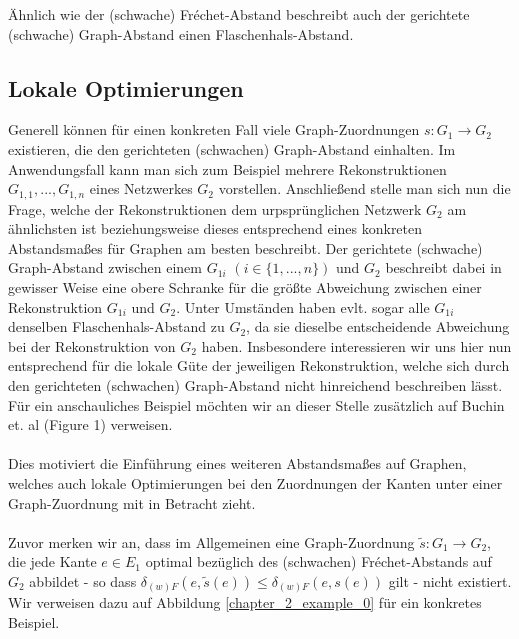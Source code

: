 \documentclass[a4paper, 12pt, twoside]{article}
\theoremstyle{Format1} %
\begin{document}
Ähnlich wie der (schwache) Fréchet-Abstand beschreibt auch der gerichtete (schwache) Graph-Abstand einen Flaschenhals-Abstand.

\subsection{Lokale Optimierungen}

Generell können für einen konkreten Fall viele Graph-Zuordnungen $s: G_1 \to G_2$ existieren, die den gerichteten (schwachen) Graph-Abstand einhalten.
Im Anwendungsfall kann man sich zum Beispiel mehrere Rekonstruktionen $G_{1,1}, ..., G_{1,n}$ eines Netzwerkes $G_2$ vorstellen.
Anschließend stelle man sich nun die Frage, welche der Rekonstruktionen dem urpsprünglichen Netzwerk $G_2$ am ähnlichsten ist beziehungsweise dieses entsprechend eines konkreten Abstandsmaßes
für Graphen am besten beschreibt.
Der gerichtete (schwache) Graph-Abstand zwischen einem $G_{1i}$ $(i \in \{1,...,n\})$ und $G_2$ beschreibt dabei in gewisser Weise eine obere Schranke für die größte Abweichung zwischen
einer Rekonstruktion $G_{1i}$ und $G_2$.
Unter Umständen haben evlt. sogar alle $G_{1i}$ denselben Flaschenhals-Abstand zu $G_2$, da sie dieselbe entscheidende Abweichung bei der Rekonstruktion von $G_2$ haben.
Insbesondere interessieren wir uns hier nun entsprechend für die lokale Güte der jeweiligen Rekonstruktion, welche sich durch den gerichteten (schwachen) Graph-Abstand nicht hinreichend
beschreiben lässt.
Für ein anschauliches Beispiel möchten wir an dieser Stelle zusätzlich auf Buchin et. al \cite{Buchin} (Figure 1) verweisen.
\\
\\
Dies motiviert die Einführung eines weiteren Abstandsmaßes auf Graphen, welches auch lokale Optimierungen bei den Zuordnungen der Kanten unter einer Graph-Zuordnung mit in Betracht zieht.
\\
\\
Zuvor merken wir an, dass im Allgemeinen eine Graph-Zuordnung $\tilde{s}: G_1 \to G_2$, die jede Kante $e \in E_1$ optimal bezüglich des (schwachen)
Fréchet-Abstands auf $G_2$ abbildet - so dass $\delta_{(w)F}(e, \tilde{s}(e)) \leq \delta_{(w)F}(e, s(e))$ gilt - nicht existiert. Wir verweisen dazu auf
Abbildung \ref{chapter_2_example_0} für ein konkretes Beispiel.
\end{document}
